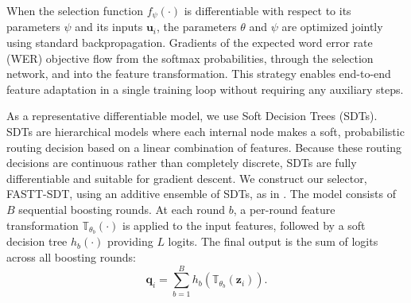 \documentclass[journal]{IEEEtran}
\begin{document}
    When the selection function $f_{\psi}(\cdot)$ is differentiable with respect
    to its parameters $\psi$ and its inputs $\mathbf{u}_{i}$, the parameters
    $\theta$ and $\psi$ are optimized jointly using standard backpropagation.
    Gradients of the expected word error rate (WER) objective flow from the softmax probabilities,
    through the selection network, and into the feature transformation. This strategy enables
    end-to-end feature adaptation in a single training loop without requiring any auxiliary steps.

    As a representative differentiable model, we use Soft Decision Trees (SDTs). SDTs are hierarchical models where each internal node makes a soft, probabilistic routing decision based on a linear combination of features. Because these routing decisions are continuous rather than completely discrete, SDTs are fully differentiable and suitable for gradient descent. We construct our selector, FASTT-SDT, using an additive ensemble of SDTs, as in \cite{karaca2026soft}. The model consists
    of $B$ sequential boosting rounds. At each round $b$, a per-round feature transformation
    $\mathbb{T}_{\theta_b}(\cdot)$ is applied to the input features, followed by
    a soft decision tree $h_{b}(\cdot)$ providing $L$ logits. The final output is the sum of logits
    across all boosting rounds:
    \begin{equation}
        \mathbf{q}_{i}= \sum_{b=1}^{B}h_{b}\!\left(\mathbb{T}_{\theta_b}(\mathbf{z}
        _{i})\right). \label{eq:bfs_output}
    \end{equation}
\end{document}
